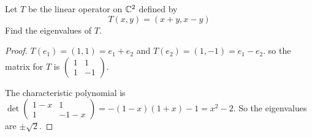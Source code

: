 \documentclass{amsart}
\begin{document}
	
\vspace{2em}


Let $T$ be the linear operator on $\mathbb{C}^2$ defined by
\[T(x,y)=(x+y,x-y)\]
Find the eigenvalues of $T$.

\begin{proof}
$T(e_1)= (1,1)=e_1+e_2$ and $T(e_2)=(1,-1)=e_1-e_2$.
	so the matrix for $T$ is $ \begin{pmatrix}
		1&1\\1&-1
	\end{pmatrix}$.
	
	The characteristic polynomial is $\det \begin{pmatrix}
		1-x&1\\1&-1-x
	\end{pmatrix}=-(1-x)(1+x)-1=x^2-2$.
	 So the eigenvalues are $\pm \sqrt{2}$.
\end{proof}

%
%
\end{document}
